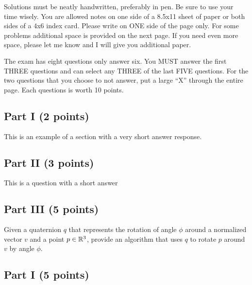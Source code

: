 \documentclass[11pt]{article}
\begin{document}
\pageHeader{\course: \proj}

Solutions must be neatly handwritten, preferably in pen.  Be sure to use your
time wisely.  You are allowed notes on one side of a 8.5x11 sheet of paper or
both sides of a 4x6 index card.  Please write on ONE side of the page only.  For
some problems additional space is provided on the next page.  If you need even
more space, please let me know and I will give you additional paper.

The exam has eight questions only answer six.  You MUST answer the first THREE
questions and can select any THREE of the last FIVE questions.  For the two
questions that you choose to not answer, put a large ``X'' through the entire
page.  Each questions is worth 10 points.

\examProblem

\subsection*{Part I (2 points)}

This is an example of a section with a very short answer response.

\veryShortAnswer

\subsection*{Part II (3 points)}

This is a question with a short answer

\shortAnswer

\subsection*{Part III (5 points)}

Given a quaternion $q$ that represents the rotation of angle $\phi$ around a
normalized vector $v$ and a point $p \in \mathbb{R}^3$, provide an algorithm that uses
$q$ to rotate $p$ around $v$ by angle $\phi$.

\examProblem

\subsection*{Part I (5 points)}
\end{document}
